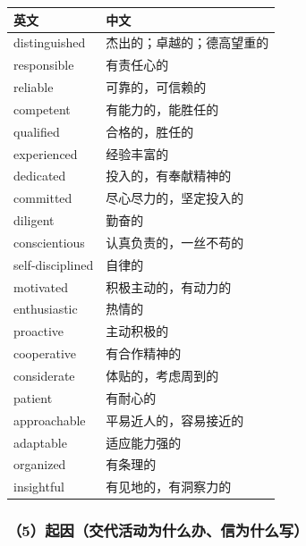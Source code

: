 \documentclass[11pt,a4paper]{ctexart}
\begin{document}
\begin{longtable}{L{9.4cm}L{6.6cm}}
\toprule
\textbf{英文} & \textbf{中文} \\
\midrule
\endhead
\bottomrule
\endlastfoot
distinguished & 杰出的；卓越的；德高望重的 \\
responsible & 有责任心的 \\
reliable & 可靠的，可信赖的 \\
competent & 有能力的，能胜任的 \\
qualified & 合格的，胜任的 \\
experienced & 经验丰富的 \\
dedicated & 投入的，有奉献精神的 \\
committed & 尽心尽力的，坚定投入的 \\
diligent & 勤奋的 \\
conscientious & 认真负责的，一丝不苟的 \\
self-disciplined & 自律的 \\
motivated & 积极主动的，有动力的 \\
enthusiastic & 热情的 \\
proactive & 主动积极的 \\
cooperative & 有合作精神的 \\
considerate & 体贴的，考虑周到的 \\
patient & 有耐心的 \\
approachable & 平易近人的，容易接近的 \\
adaptable & 适应能力强的 \\
organized & 有条理的 \\
insightful & 有见地的，有洞察力的 \\
\end{longtable}

\subsubsection{（5）起因（交代活动为什么办、信为什么写）}
\end{document}
